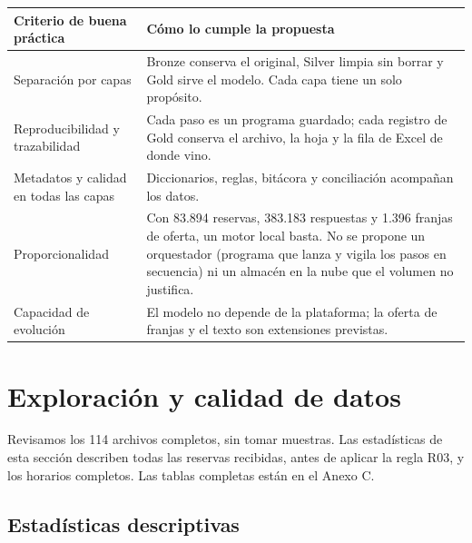 \documentclass[11pt,letterpaper]{article}
\begin{document}
\begingroup\small\setlength{\tabcolsep}{4pt}\renewcommand{\arraystretch}{1.15}
\begin{longtable}{>{\raggedright\arraybackslash}p{}>{\raggedright\arraybackslash}p{}}
\toprule
\textbf{Criterio de buena práctica} & \textbf{Cómo lo cumple la propuesta} \\
\midrule
\endhead
Separación por capas & Bronze conserva el original, Silver limpia sin borrar y Gold sirve el modelo. Cada capa tiene un solo propósito. \\
Reproducibilidad y trazabilidad & Cada paso es un programa guardado; cada registro de Gold conserva el archivo, la hoja y la fila de Excel de donde vino. \\
Metadatos y calidad en todas las capas & Diccionarios, reglas, bitácora y conciliación acompañan los datos. \\
Proporcionalidad & Con 83.894 reservas, 383.183 respuestas y 1.396 franjas de oferta, un motor local basta. No se propone un orquestador (programa que lanza y vigila los pasos en secuencia) ni un almacén en la nube que el volumen no justifica. \\
Capacidad de evolución & El modelo no depende de la plataforma; la oferta de franjas y el texto son extensiones previstas. \\
\bottomrule
\end{longtable}
\endgroup



\section{Exploración y calidad de datos}

Revisamos los 114 archivos completos, sin tomar muestras. Las estadísticas de esta sección describen todas las reservas recibidas, antes de aplicar la regla R03, y los horarios completos. Las tablas completas están en el Anexo C.

\subsection{Estadísticas descriptivas}
\end{document}
